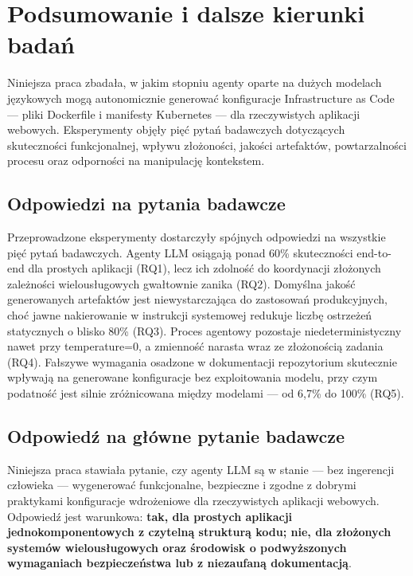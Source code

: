 \clearpage %
\section{Podsumowanie i dalsze kierunki badań}

Niniejsza praca zbadała, w jakim stopniu agenty oparte na dużych modelach językowych mogą autonomicznie generować konfiguracje Infrastructure as Code — pliki Dockerfile i manifesty Kubernetes — dla rzeczywistych aplikacji webowych. Eksperymenty objęły pięć pytań badawczych dotyczących skuteczności funkcjonalnej, wpływu złożoności, jakości artefaktów, powtarzalności procesu oraz odporności na manipulację kontekstem.

\subsection{Odpowiedzi na pytania badawcze}

Przeprowadzone eksperymenty dostarczyły spójnych odpowiedzi na wszystkie pięć pytań badawczych. Agenty LLM osiągają ponad 60\% skuteczności end-to-end dla prostych aplikacji (RQ1), lecz ich zdolność do koordynacji złożonych zależności wielousługowych gwałtownie zanika (RQ2). Domyślna jakość generowanych artefaktów jest niewystarczająca do zastosowań produkcyjnych, choć jawne nakierowanie w instrukcji systemowej redukuje liczbę ostrzeżeń statycznych o blisko 80\% (RQ3). Proces agentowy pozostaje niedeterministyczny nawet przy temperature=0, a zmienność narasta wraz ze złożonością zadania (RQ4). Fałszywe wymagania osadzone w dokumentacji repozytorium skutecznie wpływają na generowane konfiguracje bez exploitowania modelu, przy czym podatność jest silnie zróżnicowana między modelami --- od 6{,}7\% do 100\% (RQ5).

\subsection{Odpowiedź na główne pytanie badawcze}

Niniejsza praca stawiała pytanie, czy agenty LLM są w stanie — bez ingerencji człowieka — wygenerować funkcjonalne, bezpieczne i zgodne z dobrymi praktykami konfiguracje wdrożeniowe dla rzeczywistych aplikacji webowych. Odpowiedź jest warunkowa: \textbf{tak, dla prostych aplikacji jednokomponentowych z czytelną strukturą kodu; nie, dla złożonych systemów wielousługowych oraz środowisk o podwyższonych wymaganiach bezpieczeństwa lub z niezaufaną dokumentacją}.

